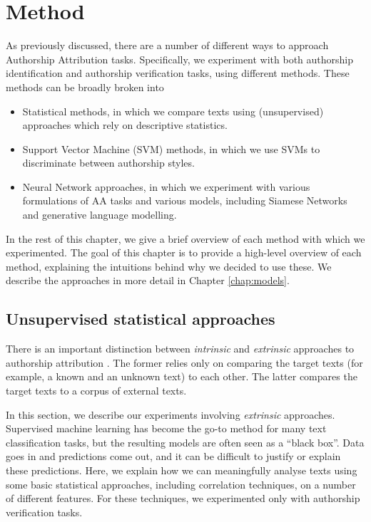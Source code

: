 \chapter{Method}
\label{chap:meth}

As previously discussed, there are a number of different ways to approach Authorship Attribution tasks. Specifically, we experiment with both authorship identification and authorship verification tasks, using different methods. These methods can be broadly broken into

\begin{itemize}
\tightlist
\item
  Statistical methods, in which we compare texts using (unsupervised) approaches which rely on descriptive statistics.
\item
  Support Vector Machine (SVM) methods, in which we use SVMs to
  discriminate between authorship styles.
\item
  Neural Network approaches, in which we experiment with various
  formulations of AA tasks and various models, including Siamese
  Networks and generative language modelling.
\end{itemize}

In the rest of this chapter, we give a brief overview of each method with which we experimented. The goal of this chapter is to provide a high-level overview of each method, explaining the intuitions behind why we decided to use these. We describe the approaches in more detail in Chapter \ref{chap:models}.

\section{Unsupervised statistical approaches}
\label{meth:unsupervised}
\label{authorship-verification-tasks}

There is an important distinction between \emph{intrinsic} and
\emph{extrinsic} approaches to authorship attribution \cite{juola2013overview}. The
former relies only on comparing the target texts (for example, a known and an
unknown text) to each other. The latter compares the target texts
to a corpus of external texts. 

In this section, we describe our experiments involving \emph{extrinsic}
approaches. Supervised machine learning has become the go-to method for
many text classification tasks, but the resulting models are often seen
as a ``black box''. Data goes in and predictions come out, and it can be
difficult to justify or explain these predictions. Here, we explain how
we can meaningfully analyse texts using some basic statistical
approaches, including correlation techniques, on a number of different
features. For these techniques, we experimented only with authorship
verification tasks.

